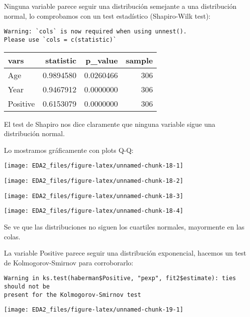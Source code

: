 \documentclass[
]{article}
\begin{document}
Ninguna variable parece seguir una distribución semejante a una
distribución normal, lo comprobamos con un test estadístico
(Shapiro-Wilk test):

\begin{verbatim}
Warning: `cols` is now required when using unnest().
Please use `cols = c(statistic)`
\end{verbatim}

\begin{tabular}{l|r|r|r}
\hline
vars & statistic & p\_value & sample\\
\hline
Age & 0.9894580 & 0.0260466 & 306\\
\hline
Year & 0.9467912 & 0.0000000 & 306\\
\hline
Positive & 0.6153079 & 0.0000000 & 306\\
\hline
\end{tabular}

El test de Shapiro nos dice claramente que ninguna variable sigue una
distribución normal.

Lo mostramos gráficamente con plots Q-Q:

\begin{center}\texttt{[image: EDA2\_files/figure-latex/unnamed-chunk-18-1]} \end{center}

\begin{center}\texttt{[image: EDA2\_files/figure-latex/unnamed-chunk-18-2]} \end{center}

\begin{center}\texttt{[image: EDA2\_files/figure-latex/unnamed-chunk-18-3]} \end{center}

\begin{center}\texttt{[image: EDA2\_files/figure-latex/unnamed-chunk-18-4]} \end{center}

Se ve que las distribuciones no siguen los cuartiles normales,
mayormente en las colas.

La variable Positive parece seguir una distribución exponencial, hacemos
un test de Kolmogorov-Smirnov para corroborarlo:

\begin{verbatim}
Warning in ks.test(haberman$Positive, "pexp", fit2$estimate): ties should not be
present for the Kolmogorov-Smirnov test
\end{verbatim}

\begin{center}\texttt{[image: EDA2\_files/figure-latex/unnamed-chunk-19-1]} \end{center}
\end{document}
